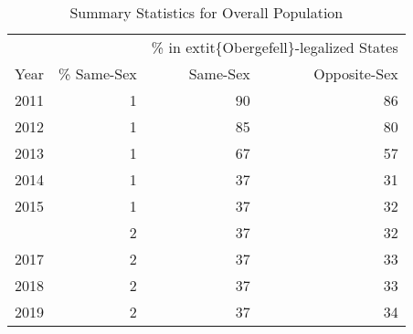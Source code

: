 \begin{table}

\caption{Summary Statistics for Overall Population}
\centering
\begin{tabular}[t]{rrrr}
\toprule
\multicolumn{2}{c}{ } & \multicolumn{2}{c}{\% in 	extit\{Obergefell\}-legalized States} \\
\cmidrule(l{3pt}r{3pt}){3-4}
Year & \% Same-Sex & Same-Sex & Opposite-Sex\\
\midrule
2011 & 1 & 90 & 86\\
2012 & 1 & 85 & 80\\
2013 & 1 & 67 & 57\\
2014 & 1 & 37 & 31\\
2015 & 1 & 37 & 32\\
\addlinespace
2016 & 2 & 37 & 32\\
2017 & 2 & 37 & 33\\
2018 & 2 & 37 & 33\\
2019 & 2 & 37 & 34\\
\bottomrule
\end{tabular}
\end{table}
